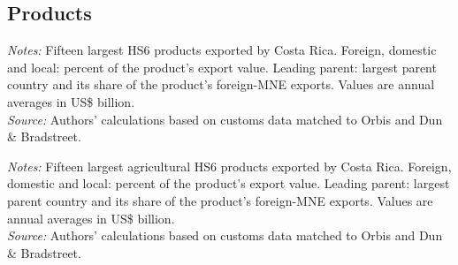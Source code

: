 \documentclass[11pt,a4paper]{article}
\begin{document}
\subsection{Products}
\begin{table}[H]\centering\footnotesize%
  \caption{Costa Rica: Fifteen Largest Export Products}%
  \label{tab:c_hs6_CRI}%
  \par\vspace{3pt}%
  \begin{minipage}{0.95\textwidth}\footnotesize %
  \textit{Notes:} Fifteen largest HS6 products exported by Costa Rica. Foreign, domestic and local: percent of the product's export value. Leading parent: largest parent country and its share of the product's foreign-MNE exports. Values are annual averages in US\$ billion.\\[3pt]%
  \textit{Source:} Authors' calculations based on customs data matched to Orbis and Dun \& Bradstreet.%
  \end{minipage}%
  \end{table}
\begin{table}[H]\centering\footnotesize%
  \caption{Costa Rica, Agriculture: Fifteen Largest Export Products}%
  \label{tab:c_hs6_CRI_agro}%
  \par\vspace{3pt}%
  \begin{minipage}{0.95\textwidth}\footnotesize %
  \textit{Notes:} Fifteen largest agricultural HS6 products exported by Costa Rica. Foreign, domestic and local: percent of the product's export value. Leading parent: largest parent country and its share of the product's foreign-MNE exports. Values are annual averages in US\$ billion.\\[3pt]%
  \textit{Source:} Authors' calculations based on customs data matched to Orbis and Dun \& Bradstreet.%
  \end{minipage}%
  \end{table}
\end{document}
